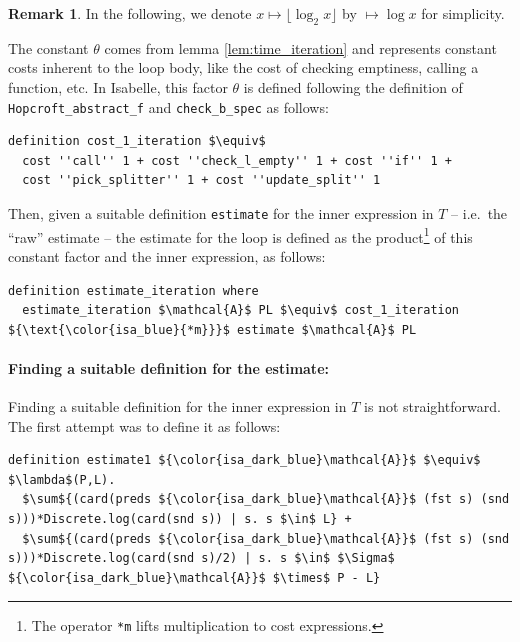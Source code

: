\documentclass[12pt, a4 paper]{article}
\theoremstyle{definition}
\newtheorem{remark}{Remark}
\begin{document}
\begin{remark}
In the following, we denote $x \mapsto \lfloor \log_2 x \rfloor$ by $\mapsto \log x$ for simplicity.
\end{remark}

The constant $\theta$ comes from lemma \ref{lem:time_iteration} and represents constant costs inherent to the loop body, like the cost of checking emptiness, calling a function, etc.
In Isabelle, this factor $\theta$ is defined following the definition of \texttt{Hopcroft\_abstract\_f} and \texttt{check\_b\_spec} as follows:

\begin{lstlisting}[language=Isabelle]
definition cost_1_iteration $\equiv$ 
  cost ''call'' 1 + cost ''check_l_empty'' 1 + cost ''if'' 1 +
  cost ''pick_splitter'' 1 + cost ''update_split'' 1
\end{lstlisting}

Then, given a suitable definition \texttt{estimate} for the inner expression in $T$ -- i.e.\ the ``raw'' estimate -- the estimate for the loop is defined as the product\footnote{The operator \texttt{{\color{isa_blue}*m}} lifts multiplication to cost expressions.} of this constant factor and the inner expression, as follows:

\begin{lstlisting}[language=Isabelle]
definition estimate_iteration where
  estimate_iteration $\mathcal{A}$ PL $\equiv$ cost_1_iteration ${\text{\color{isa_blue}{*m}}}$ estimate $\mathcal{A}$ PL
\end{lstlisting}

\paragraph{Finding a suitable definition for the estimate:}
Finding a suitable definition for the inner expression in $T$ is not straightforward. The first attempt was to define it as follows:

\begin{lstlisting}[language=Isabelle]
definition estimate1 ${\color{isa_dark_blue}\mathcal{A}}$ $\equiv$ $\lambda$(P,L).
  $\sum${(card(preds ${\color{isa_dark_blue}\mathcal{A}}$ (fst s) (snd s)))*Discrete.log(card(snd s)) | s. s $\in$ L} +
  $\sum${(card(preds ${\color{isa_dark_blue}\mathcal{A}}$ (fst s) (snd s)))*Discrete.log(card(snd s)/2) | s. s $\in$ $\Sigma$ ${\color{isa_dark_blue}\mathcal{A}}$ $\times$ P - L}
\end{lstlisting}
\end{document}

